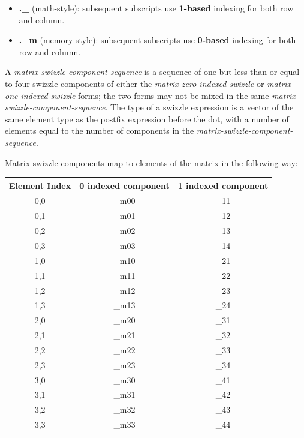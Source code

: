 \begin{itemize}
\item \textbf{.\_} (math-style): subsequent subscripts use \textbf{1-based}
 indexing for both row and column.
\item \textbf{.\_m} (memory-style): subsequent subscripts use \textbf{0-based}
 indexing for both row and column.
\end{itemize}

\p A \textit{matrix-swizzle-component-sequence} is a sequence of one but less
than or equal to four swizzle components of either the
\textit{matrix-zero-indexed-swizzle} or \textit{matrix-one-indexed-swizzle}
forms; the two forms may not be mixed in the same
\textit{matrix-swizzle-component-sequence}. The type of a swizzle expression is
a vector of the same element type as the postfix expression before the dot,
with a number of elements equal to the number of components in the
\textit{matrix-swizzle-component-sequence}.

\p Matrix swizzle components map to elements of the matrix in the following way:

\begin{center}
  \begin{tabular}{|| c | c | c ||}
    \hline
    Element Index & 0 indexed component & 1 indexed component \\
    \hline
    0,0 & \_m00 & \_11 \\
    0,1 & \_m01 & \_12 \\
    0,2 & \_m02 & \_13 \\
    0,3 & \_m03 & \_14 \\
    1,0 & \_m10 & \_21 \\
    1,1 & \_m11 & \_22 \\
    1,2 & \_m12 & \_23 \\
    1,3 & \_m13 & \_24 \\
    2,0 & \_m20 & \_31 \\
    2,1 & \_m21 & \_32 \\
    2,2 & \_m22 & \_33 \\
    2,3 & \_m23 & \_34 \\
    3,0 & \_m30 & \_41 \\
    3,1 & \_m31 & \_42 \\
    3,2 & \_m32 & \_43 \\
    3,3 & \_m33 & \_44 \\
    \hline
  \end{tabular}
\end{center}

